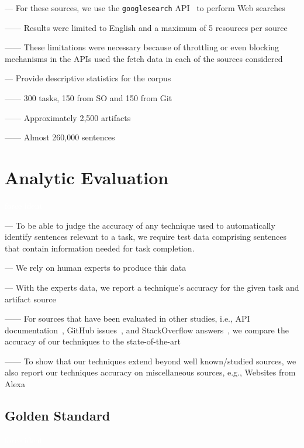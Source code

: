\vspace{3mm}

--- For these sources, we use the \texttt{googlesearch} API~\cite{googlesearch} to perform Web searches

------ Results were limited to English and a maximum of 5 resources per source 

------ These limitations were necessary because of throttling or even blocking mechanisms in the APIs used the fetch data in each of the sources considered \vspace{3mm}

--- Provide descriptive statistics for the corpus

------ 300 tasks, 150 from SO and 150 from Git

------ Approximately 2,500 artifacts

------ Almost 260,000 sentences

\clearpage


\section{Analytic Evaluation}
\textcolor{white}{force ident} %

--- To be able to judge the accuracy of any technique used to automatically identify sentences relevant to a task,
we require test data comprising sentences that contain information needed for task completion. \vspace{3mm}

--- We rely on human experts to produce this data \vspace{3mm}


--- With the experts data, we report a technique's accuracy for the given task and artifact source

------ For sources that have been evaluated in other studies, i.e., API documentation~\cite{Robillard2015}, GitHub issues~\cite{Lotufo2012}, and StackOverflow answers~\cite{Xu2017}, we compare the accuracy of our techniques 
to the state-of-the-art

------ To show that our techniques extend beyond well known/studied sources, we also report our techniques accuracy on miscellaneous sources, e.g., Websites from Alexa



\subsection{Golden Standard}
\textcolor{white}{force ident} %

